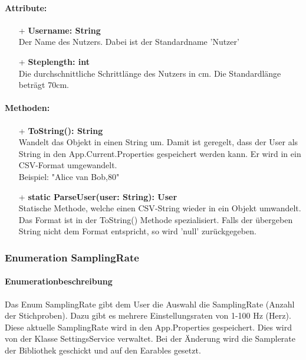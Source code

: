 \documentclass[a4paper,12pt]{article}
\begin{document}
	\paragraph{Attribute:}
	\begin{itemize}
		\item[+] \textbf{Username: String}\\Der Name des Nutzers. Dabei ist der Standardname 'Nutzer'\\
		\item[+] \textbf{Steplength: int}\\Die durchschnittliche Schrittlänge des Nutzers in cm. Die Standardlänge beträgt 70cm.\\
	\end{itemize}
	\paragraph{Methoden:}
	\begin{itemize}
		\item[+] \textbf{ToString(): String}\\Wandelt das Objekt in einen String um. Damit ist geregelt, dass der User als String in den App.Current.Properties gespeichert werden kann. Er wird in ein \Gls{CSV}-Format umgewandelt.\\
		Beispiel: "Alice van Bob,80"\\
		\item[+] \textbf{static ParseUser(user: String): User}\\Statische Methode, welche einen \Gls{CSV}-String wieder in  ein Objekt umwandelt. Das Format ist in der ToString() Methode spezialisiert. Falls der übergeben String nicht dem Format entspricht, so wird 'null' zurückgegeben.\\
	\end{itemize}

\subsubsection{Enumeration SamplingRate}
	\paragraph{Enumerationbeschreibung}
	Das Enum SamplingRate gibt dem User die Auswahl die SamplingRate (Anzahl der Stichproben). Dazu gibt es mehrere Einstellungsraten von 1-100 Hz (Herz). Diese aktuelle SamplingRate wird in den App.Properties gespeichert. Dies wird von der Klasse SettingsService verwaltet. 
	Bei der Änderung wird die Samplerate der Bibliothek geschickt und auf den \Gls{Earables} gesetzt.
	
\end{document}
